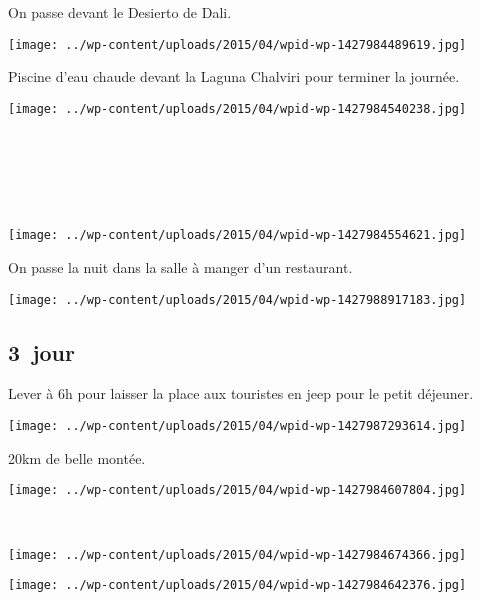 \pagebreak
 On passe devant le Desierto de Dali.
\begin{center} \texttt{[image: ../wp-content/uploads/2015/04/wpid-wp-1427984489619.jpg]} \end{center}

 Piscine d'eau chaude devant la Laguna Chalviri pour terminer la journée.
\begin{center} \texttt{[image: ../wp-content/uploads/2015/04/wpid-wp-1427984540238.jpg]} \end{center}
\vspace{-\topsep}

\pagebreak
\subsection*{~}

~\\
\begin{center} \texttt{[image: ../wp-content/uploads/2015/04/wpid-wp-1427984554621.jpg]} \end{center}

 On passe la nuit dans la salle à manger d'un restaurant.
\begin{center} \texttt{[image: ../wp-content/uploads/2015/04/wpid-wp-1427988917183.jpg]} \end{center}
\vspace{-\topsep}

\pagebreak
\subsection*{3\ieme\ jour} 
 Lever à 6h pour laisser la place aux touristes en jeep pour le petit déjeuner.
\begin{center} \texttt{[image: ../wp-content/uploads/2015/04/wpid-wp-1427987293614.jpg]} \end{center}

 20km de belle montée.
\begin{center} \texttt{[image: ../wp-content/uploads/2015/04/wpid-wp-1427984607804.jpg]} \end{center}
\vspace{-\topsep}

\pagebreak
~
\begin{center} \texttt{[image: ../wp-content/uploads/2015/04/wpid-wp-1427984674366.jpg]} \end{center}
\begin{center} \texttt{[image: ../wp-content/uploads/2015/04/wpid-wp-1427984642376.jpg]} \end{center}
\vspace{-\topsep}
\vspace{-3.25mm}


